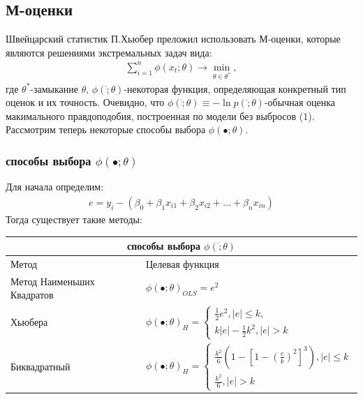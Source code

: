 \documentclass[12pt]{article}
\begin{document}
\subsection{М-оценки}
Швейцарский статистик П.Хьюбер преложил использовать М-оценки\cite{Kharin}, которые являются решениями экстремальных задач вида:
\begin{eqnarray}
    \sum_{i=1}^{n}\phi(x_t;\theta)\rightarrow \min_{\theta\in \theta^{*}},
\end{eqnarray}
где $\theta^{*}$-замыкание $\theta$, $\phi(\dot;\theta)$-некоторая функция, определяющая конкретный тип оценок и их точность.\hfill\break
Очевидно, что $\phi(\dot;\theta)\equiv - \ln{p(\dot;\theta)}$-обычная оценка макимального правдоподобия, построенная по модели без выбросов (1).\hfill\break
Рассмотрим теперь некоторые способы выбора $\phi(\bullet;\theta)$.\hfill\break
\subsubsection{способы выбора  $\phi(\bullet;\theta)$}
Для начала определим:
\begin{eqnarray}
    e=y_i-(\beta_0+\beta_1 x_{i1}+\beta_2 x_{i2}+\dots+\beta_n x_{in})
\end{eqnarray}
Тогда существует такие методы\cite{RobustRegression}:\hfill\break
\begin{tabular}{ |p{3cm}|p{10cm} | }
    \hline
    \multicolumn{2}{|c|}{способы выбора $\phi(\dot;\theta)$} \\
    \hline
    Метод& Целевая функция\\
    \hline
    Метод Наименьших Квадратов&$\phi(\bullet;\theta)_{OLS}=e^2$\\
    Хьюбера&$\phi(\bullet;\theta)_{H}=
        \begin{cases}
            \frac{1}{2}e^2, |e|\leq k,\\
            k|e|-\frac{1}{2}k^2, |e|>k
        \end{cases}$\\
    Биквадратный& $\phi(\bullet;\theta)_{H}=
    \begin{cases}
        \frac{k^2}{6}(1-[1-(\frac{e}{k})^2]^3), |e|\leq k\\
        \frac{k^2}{6}, |e|>k
    \end{cases}$\\
    \hline
\end{tabular}
\end{document}
